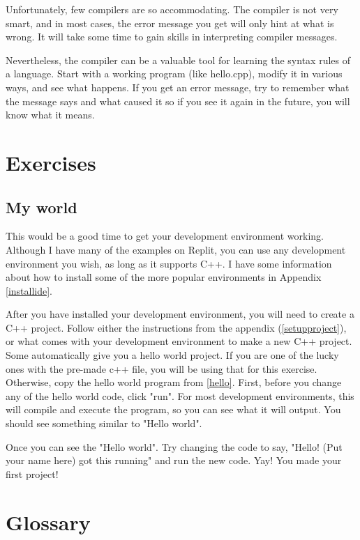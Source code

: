 Unfortunately, few compilers are so accommodating.  The compiler
is not very smart, and in most cases, the error message
you get will only hint at what is wrong.  It will take
some time to gain skills in interpreting compiler messages.

Nevertheless, the compiler can be a valuable tool for learning the
syntax rules of a language.  Start with a working program
(like hello.cpp), modify it in various ways, and see what happens.
If you get an error message, try to remember what the message says
and what caused it so if you see it again in the future, you
will know what it means.

\section{Exercises}
\subsection{My world}
This would be a good time to get your development environment working.
Although I have many of the examples on Replit, you can use any development
environment you wish, as long as it supports C++.
I have some information about how to install some of the more popular
environments in Appendix \ref{installide}.

After you have installed your development environment, you will need to create a C++ project. Follow either the instructions from the appendix (\ref{setupproject}), or what comes with
your development environment to make a new C++ project. Some automatically
give you a hello world project. If you are one of the lucky ones with the
pre-made c++ file, you will be using that for this exercise. Otherwise, copy the hello
world program from \ref{hello}. First, before you change any of the hello world code, click
"run". For most development environments, this will compile and execute 
the program, so you can see what it will output. You should see something
similar to "Hello world". 

Once you can see the "Hello world". Try changing the code to say, "Hello!
(Put your name here) got this running" and run the new code. Yay! You
made your first project!

\section{Glossary}

